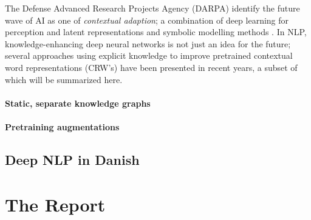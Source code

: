 \documentclass[main.tex]{subfiles}
\begin{document}
The Defense Advanced Research Projects Agency (DARPA) identify the future wave of AI as one of \emph{contextual adaption}; a combination of deep learning for perception and latent representations and symbolic modelling methods \cite{darpa17ai}.
In NLP, knowledge-enhancing deep neural networks is not just an idea for the future; several approaches using explicit knowledge to improve pretrained contextual word representations (CRW's) have been presented in recent years, a subset of which will be summarized here.

\paragraph{Static, separate knowledge graphs}

\paragraph{Pretraining augmentations}




\subsection{Deep NLP in Danish}
%
%

\section{The Report}%
\label{sec:The Report}
\end{document}
